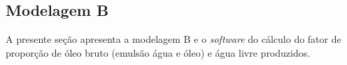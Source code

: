 \documentclass[11pt]{article} %
\begin{document}
% 
% 
% 
% 

\subsection{Modelagem B } 
\label{sec:estudo_caso}

%
 

A presente seção apresenta a modelagem B e o \textit{software} do cálculo do fator de proporção de
óleo bruto (emulsão água e óleo) e  água livre produzidos. 
\end{document}
